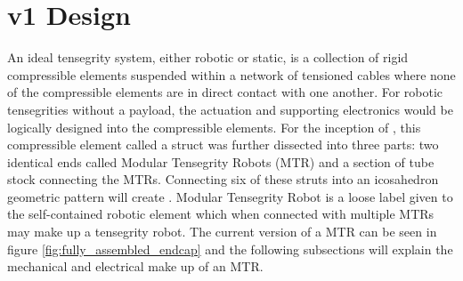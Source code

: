 \chapter{\SB{} v1 Design}
\label{design}

An ideal tensegrity system, either robotic or static, is a collection of rigid compressible elements suspended within a network of tensioned cables where none of the compressible elements are in direct contact with one another. 
For robotic tensegrities without a payload, the actuation and supporting electronics would be logically designed into the compressible elements. 
For the inception of \SB{}, this compressible element called a struct was further dissected into three parts: two identical ends called Modular Tensegrity Robots (MTR) and a section of tube stock connecting the MTRs.
Connecting six of these struts into an icosahedron geometric pattern will create \SB{}.
Modular Tensegrity Robot is a loose label given to the self-contained robotic element which when connected with multiple MTRs may make up a tensegrity robot.
The current version of a MTR can be seen in figure \ref{fig:fully_assembled_endcap} and the following subsections will explain the mechanical and electrical make up of an MTR.

